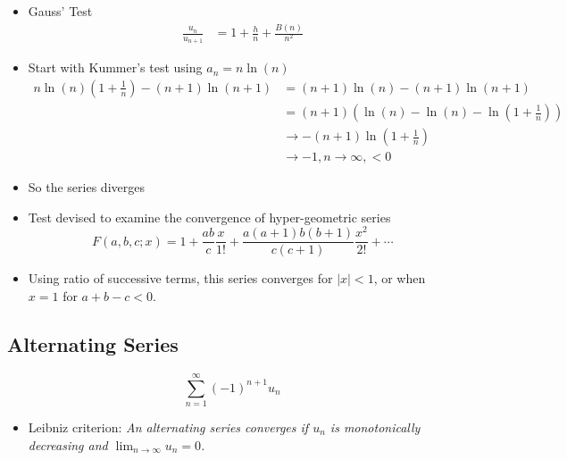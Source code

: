 \documentclass[cplx.tex]{subfiles}
\begin{document}
\chapter{}
\begin{itemize}
    \item Gauss' Test
        \begin{align}
            \frac{u_n}{u_{n+1}} &= 1 + \frac{h}{n} + \frac{B(n)}{n^2}
        \end{align}
    \item Start with Kummer's test using $a_n = n\ln(n)$
        \begin{align}
            n\ln(n)\left(1 + \frac 1n\right) - (n+1)\ln(n+1) &= (n+1)\ln(n) - (n+1)\ln(n+1) \\
                                                             &= (n+1)\left(\ln(n) - \ln(n) - \ln\left(1+\frac 1n\right)\right) \\
                                                             &\to -(n+1)\ln\left(1+\frac 1n\right) \\
                                                             &\to -1, n \to \infty, < 0
        \end{align}
    \item So the series diverges
    \item Test devised to examine the convergence of hyper-geometric series
        \begin{equation}
            F(a,b,c;x) = 1 + \frac{ab}{c}\frac{x}{1!} + \frac{a(a+1)b(b+1)}{c(c+1)}\frac{x^2}{2!} + \cdots
        \end{equation}
    \item Using ratio of successive terms, this series converges for $|x| < 1$, or when $x = 1$ for $a+b-c < 0$.
\end{itemize}

\section{Alternating Series}
\begin{equation}
    \sum_{n=1}^\infty (-1)^{n+1}u_n
\end{equation}
\begin{itemize}
    \item Leibniz criterion: \emph{An alternating series converges if $u_n$ is monotonically decreasing and $\lim_{n\to\infty} u_n = 0$.}
\end{itemize}
\end{document}
